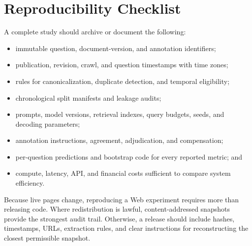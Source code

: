 \section{Reproducibility Checklist}
\label{sec:reproducibility}

A complete study should archive or document the following:

\begin{itemize}
  \item immutable question, document-version, and annotation identifiers;
  \item publication, revision, crawl, and question timestamps with time zones;
  \item rules for canonicalization, duplicate detection, and temporal eligibility;
  \item chronological split manifests and leakage audits;
  \item prompts, model versions, retrieval indexes, query budgets, seeds, and
    decoding parameters;
  \item annotation instructions, agreement, adjudication, and compensation;
  \item per-question predictions and bootstrap code for every reported metric;
    and
  \item compute, latency, API, and financial costs sufficient to compare system
    efficiency.
\end{itemize}

Because live pages change, reproducing a Web experiment requires more than
releasing code.  Where redistribution is lawful, content-addressed snapshots
provide the strongest audit trail.  Otherwise, a release should include hashes,
timestamps, URLs, extraction rules, and clear instructions for reconstructing
the closest permissible snapshot.
